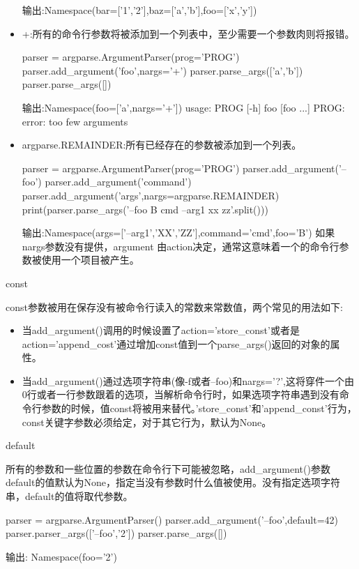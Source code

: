 \begin{itemize}
\begin{python}
\end{python}
输出:Namespace(bar=['1','2'],baz=['a','b'],foo=['x','y'])
\item +:所有的命令行参数将被添加到一个列表中，至少需要一个参数肉则将报错。
\begin{python}
parser = argparse.ArgumentParser(prog='PROG')
parser.add_argument('foo',nargs='+')
parser.parse_args(['a','b'])
parser.parse_args([])
\end{python}
输出:Namespace(foo=['a',nargs='+'])\newline
usage: PROG [-h] foo [foo ...]\newline
PROG: error: too few arguments\newline
\item argparse.REMAINDER:所有已经存在的参数被添加到一个列表。
\begin{python}
parser = argparse.ArgumentParser(prog='PROG')
parser.add_argument('--foo')
parser.add_argument('command')
parser.add_argument('args',nargs=argparse.REMAINDER)
print(parser.parse_args('--foo B cmd --arg1 xx zz'.split()))
\end{python}
输出:Namespace(args=['--arg1','XX','ZZ'],command='cmd',foo='B')
如果nargs参数没有提供，argument 由action决定，通常这意味着一个的命令行参数被使用一个项目被产生。
\end{itemize}
const\par
const参数被用在保存没有被命令行读入的常数来常数值，两个常见的用法如下:
\begin{itemize}
\item 当add\_argument()调用的时候设置了action='store\_const'或者是action='append\_cost'通过增加const值到一个parse\_args()返回的对象的属性。
\item 当add\_argument()通过选项字符串(像-f或者--foo)和nargs='?',这将穿件一个由0行或者一行参数跟着的选项，当解析命令行时，如果选项字符串遇到没有命令行参数的时候，值const将被用来替代。'store\_const'和'append\_const'行为，const关键字参数必须给定，对于其它行为，默认为None。
\end{itemize}
default\par
所有的参数和一些位置的参数在命令行下可能被忽略，add\_argument()参数default的值默认为None，指定当没有参数时什么值被使用。没有指定选项字符串，default的值将取代参数。
\begin{python}
parser = argparse.ArgumentParser()
parser.add_argument('--foo',default=42)
parser.parser_args(['--foo','2'])
parser.parse_args([])
\end{python}
输出:
Namespace(foo='2')\newline
